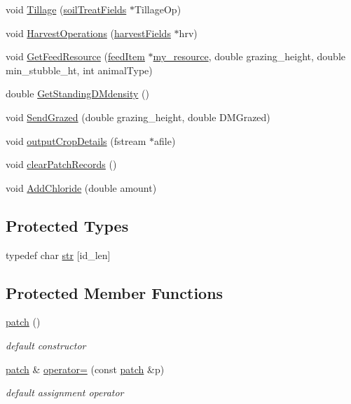\begin{DoxyCompactItemize}
\item 
void \hyperlink{classpatch_a8e0f4140df73da5dadd9a4aca8a7a7ee}{Tillage} (\hyperlink{classsoil_treat_fields}{soilTreatFields} $\ast$TillageOp)
\item 
void \hyperlink{classpatch_a79dd8d0f305e1ec56041fb8c041297cf}{HarvestOperations} (\hyperlink{classharvest_fields}{harvestFields} $\ast$hrv)
\item 
void \hyperlink{classpatch_a5a5c69eaf98d19b29f47e1a201901c7d}{GetFeedResource} (\hyperlink{classfeed_item}{feedItem} $\ast$\hyperlink{classpatch_a97e7c201cc90ebbdc6035a8465ebbaf2}{my\_\-resource}, double grazing\_\-height, double min\_\-stubble\_\-ht, int animalType)
\item 
double \hyperlink{classpatch_ac2ef357347b2fe9682d93a6c9f4556ef}{GetStandingDMdensity} ()
\item 
void \hyperlink{classpatch_a91c94802f8e2ebc3ebec73412165b2c3}{SendGrazed} (double grazing\_\-height, double DMGrazed)
\item 
void \hyperlink{classpatch_a4b4356190e88f7e5d1a538173556cc18}{outputCropDetails} (fstream $\ast$afile)
\item 
void \hyperlink{classpatch_a2b2bcc729804b8dac268f097e2a17104}{clearPatchRecords} ()
\item 
void \hyperlink{classpatch_a159121229ee7fb5b6d4094a99bdfe691}{AddChloride} (double amount)
\end{DoxyCompactItemize}
\subsection*{Protected Types}
\begin{DoxyCompactItemize}
\item 
typedef char \hyperlink{classpatch_a88e54bffc2427ce8f8afe0c673b76030}{str} \mbox{[}id\_\-len\mbox{]}
\end{DoxyCompactItemize}
\subsection*{Protected Member Functions}
\begin{DoxyCompactItemize}
\item 
\hyperlink{classpatch_ac4c885fe59fc247c9e6f4871ac8966a4}{patch} ()
\begin{DoxyCompactList}\small\item\em default constructor \item\end{DoxyCompactList}\item 
\hyperlink{classpatch}{patch} \& \hyperlink{classpatch_aaa485c520a0fb67c68b2a5cfbe12d99e}{operator=} (const \hyperlink{classpatch}{patch} \&p)
\begin{DoxyCompactList}\small\item\em default assignment operator \item\end{DoxyCompactList}\end{DoxyCompactItemize}
